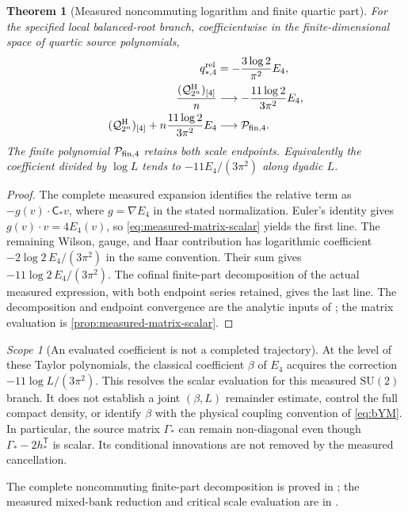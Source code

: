 \documentclass[11pt,oneside,openany]{book}
\newtheorem{theorem}{Theorem}[chapter]
\theoremstyle{definition}
\theoremstyle{remark}
\newtheorem{scope}[scope]{Scope}
\newcommand{\SU}{\mathrm{SU}}
\newcommand{\src}[2]{\cite[#2]{#1}}
\newcommand{\sourcebasis}[1]{\par\smallskip\noindent #1\par}
\begin{document}
\begin{theorem}[Measured noncommuting logarithm and finite quartic part]
\label{thm:measured-quartic-log}
For the specified local balanced-root branch, coefficientwise in the
finite-dimensional space of quartic source polynomials,
\begin{align}
 q_{*,4}^{\rm rel}&=-\frac{3\log2}{\pi^2}E_4,\notag\\
 \frac{(\mathcal Q_{2^n}^{\rm H})_{[4]}}n
       &\longrightarrow-\frac{11\log2}{3\pi^2}E_4,\notag\\
 (\mathcal Q_{2^n}^{\rm H})_{[4]}
         +n\frac{11\log2}{3\pi^2}E_4
       &\longrightarrow\mathcal P_{{\rm fin},4}.
 \label{eq:measured-quartic-log}
\end{align}
The finite polynomial $\mathcal P_{{\rm fin},4}$ retains both scale
endpoints. Equivalently the coefficient divided by $\log L$ tends to
$-11E_4/(3\pi^2)$ along dyadic $L$.
\end{theorem}
\begin{proof}
The complete measured expansion identifies the relative term as
$-g(v)\cdot\mathsf C_*v$, where $g=\nabla E_4$ in the stated
normalization. Euler's identity gives $g(v)\cdot v=4E_4(v)$, so
\cref{eq:measured-matrix-scalar} yields the first line. The remaining
Wilson, gauge, and Haar contribution has logarithmic coefficient
$-2\log2\,E_4/(3\pi^2)$ in the same convention. Their sum gives
$-11\log2\,E_4/(3\pi^2)$. The cofinal finite-part decomposition of the
actual measured expression, with both endpoint series retained, gives
the last line. The decomposition and endpoint convergence are the
analytic inputs of \src{F14}{V19--V22}; the matrix evaluation is
\cref{prop:measured-matrix-scalar}.
\end{proof}

\begin{scope}[An evaluated coefficient is not a completed trajectory]
At the level of these Taylor polynomials, the classical coefficient
$\beta$ of $E_4$ acquires the correction $-11\log L/(3\pi^2)$.
This resolves the scalar evaluation for this measured $\SU(2)$ branch.
It does not establish a joint $(\beta,L)$ remainder estimate, control
the full compact density, or identify $\beta$ with the physical
coupling convention of \cref{eq:bYM}. In particular, the source matrix
$\Gamma_*$ can remain non-diagonal even though
$\Gamma_*-2h_*^{\mathsf T}$ is scalar. Its conditional innovations
are not removed by the measured cancellation.
\end{scope}
\sourcebasis{The complete noncommuting finite-part decomposition is
proved in \src{F14}{V19--V22}; the measured mixed-bank reduction and
critical scale evaluation are in \src{F14}{V28--V30}.}
\end{document}
